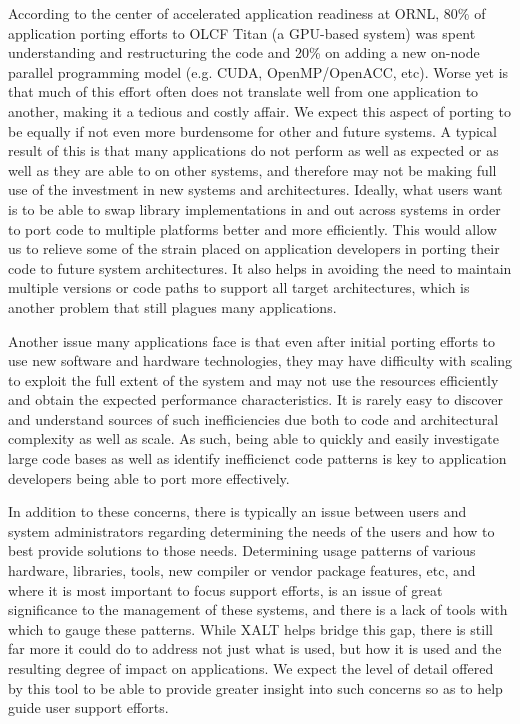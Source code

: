 According to the center of accelerated application readiness at \acs{ORNL}, 80\% of application porting efforts to OLCF Titan (a \acs{GPU}-based system) was spent understanding and restructuring the code and 20\% on adding a new on-node parallel programming model (e.g. CUDA, OpenMP/OpenACC, etc).
Worse yet is that much of this effort often does not translate well from one application to another, making it a tedious and costly affair.
We expect this aspect of porting to be equally if not even more burdensome for other and future systems.
A typical result of this is that many applications do not perform as well as expected or as well as they are able to on other systems, and therefore may not be making full use of the investment in new systems and architectures.
Ideally, what users want is to be able to swap library implementations in and out across systems in order to port code to multiple platforms better and more efficiently.
This would allow us to relieve some of the strain placed on application developers in porting their code to future system architectures.
It also helps in avoiding the need to maintain multiple versions or code paths to support all target architectures, which is another problem that still plagues many applications.

Another issue many applications face is that even after initial porting efforts to use new software and hardware technologies, they may have difficulty with scaling to exploit the full extent of the system and may not use the resources efficiently and obtain the expected performance characteristics.
It is rarely easy to discover and understand sources of such inefficiencies due both to code and architectural complexity as well as scale.
As such, being able to quickly and easily investigate large code bases as well as identify inefficienct code patterns is key to application developers being able to port more effectively.

In addition to these concerns, there is typically an issue between users and system administrators regarding determining the needs of the users and how to best provide solutions to those needs.
Determining usage patterns of various hardware, libraries, tools, new compiler or vendor package features, etc, and where it is most important to focus support efforts, is an issue of great significance to the management of these systems, and there is a lack of tools with which to gauge these patterns.
While XALT helps bridge this gap, there is still far more it could do to address not just what is used, but how it is used and the resulting degree of impact on applications.
We expect the level of detail offered by this tool to be able to provide greater insight into such concerns so as to help guide user support efforts.

